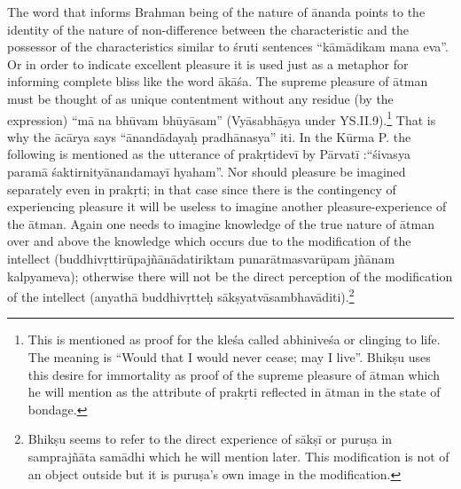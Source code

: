 The word that informs Brahman being of the nature of ānanda points to the identity of the nature of non-difference  between the characteristic and the possessor of the characteristics similar to śruti sentences “kāmādikam mana eva”. Or in order to indicate excellent pleasure it is used just as a metaphor for informing complete bliss like the word ākāśa. The supreme pleasure of ātman must be thought of as unique contentment without any residue (by the expression) “mā na bhūvam bhūyāsam” (Vyāsabhāṣya under YS.II.9).\footnote{This is mentioned as proof for the kleśa called abhiniveśa or clinging to life. The meaning is “Would that I would never cease; may I live”. Bhikṣu uses this desire for immortality as proof of the supreme pleasure of ātman which he will mention as the attribute of prakṛti reflected in ātman in the state of bondage.} That is why the ācārya says “ānandādayaḥ pradhānasya” iti. In the Kūrma P. the following is mentioned as the utterance of prakṛtidevī by Pārvatī :“śivasya paramā śaktirnityānandamayī hyaham”. Nor should pleasure be imagined separately even in prakṛti; in that case since there is the contingency of experiencing pleasure it will be useless to imagine another pleasure-experience of the ātman. Again one needs to imagine knowledge of the true nature of ātman over and above the knowledge which occurs due to the modification of the intellect (buddhivṛttirūpajñānādatiriktam punarātmasvarūpam jñānam kalpyameva); otherwise there will not be the direct perception of the modification of the intellect (anyathā buddhivṛtteḥ sākṣyatvāsambhavāditi).\footnote{Bhikṣu seems to refer to the direct experience of sākṣī or puruṣa in samprajñāta samādhi which he will mention later. This modification is not of an object outside but it is puruṣa’s own image in the modification.} 



